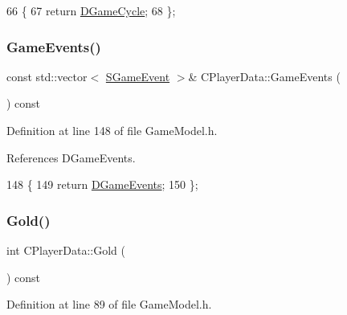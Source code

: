 \begin{DoxyCode}
66                              \{
67             \textcolor{keywordflow}{return} \hyperlink{classCPlayerData_ae92ca06a63a01681dd9f3ddc17c0e106}{DGameCycle};   
68         \};
\end{DoxyCode}
\hypertarget{classCPlayerData_ab82e14be0012e6bedfa2035e1c95ae81}{}\label{classCPlayerData_ab82e14be0012e6bedfa2035e1c95ae81} 
\subsubsection{\texorpdfstring{Game\+Events()}{GameEvents()}}
{\footnotesize\ttfamily const std\+::vector$<$ \hyperlink{structSGameEvent}{S\+Game\+Event} $>$\& C\+Player\+Data\+::\+Game\+Events (\begin{DoxyParamCaption}{ }\end{DoxyParamCaption}) const\hspace{0.3cm}{\ttfamily [inline]}}



Definition at line 148 of file Game\+Model.\+h.



References D\+Game\+Events.


\begin{DoxyCode}
148                                                          \{
149             \textcolor{keywordflow}{return} \hyperlink{classCPlayerData_a9a7af43e88055d6d1a384a8817a655a0}{DGameEvents};
150         \};
\end{DoxyCode}
\hypertarget{classCPlayerData_afa5c728fc86335a9ca00b5121c0ec765}{}\label{classCPlayerData_afa5c728fc86335a9ca00b5121c0ec765} 
\subsubsection{\texorpdfstring{Gold()}{Gold()}}
{\footnotesize\ttfamily int C\+Player\+Data\+::\+Gold (\begin{DoxyParamCaption}{ }\end{DoxyParamCaption}) const\hspace{0.3cm}{\ttfamily [inline]}}



Definition at line 89 of file Game\+Model.\+h.



